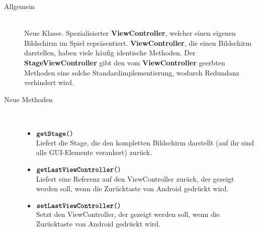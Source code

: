 \begin{description}
\item[Allgemein] \hfill \\ Neue Klasse. Spezialisierter \textbf{ViewController}, welcher einen eigenen Bildschirm im Spiel repräsentiert. \textbf{ViewController}, die einen Bildschirm darstellen, haben viele häufig identische Methoden. Der \textbf{StageViewController} gibt den vom \textbf{ViewController} geerbten Methoden eine solche Standardimplementierung, wodurch Redundanz verhindert wird.

\item[Neue Methoden] \hfill \\
	\vspace{-.8cm}
	\begin{itemize}
		\item $\texttt{\textbf{getStage}()}$ \\ Liefert die Stage, die den kompletten Bildschirm darstellt (auf ihr sind alle GUI-Elemente verankert) zurück.
		\item $\texttt{\textbf{getLastViewController}()}$ \\ Liefert eine Referenz auf den ViewController zurück, der gezeigt werden soll, wenn die Zurücktaste von Android gedrückt wird.
		\item $\texttt{\textbf{setLastViewController}()}$ \\ Setzt den ViewController, der gezeigt werden soll, wenn die Zurücktaste von Android gedrückt wird.
	\end{itemize}
\end{description}